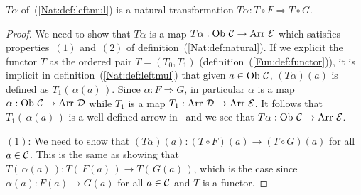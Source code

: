 \begin{prop}\label{Nat:prop:leftmul}
    $T\alpha$ of~(\ref{Nat:def:leftmul}) is a natural transformation 
    $T\alpha:T\circ F\Rightarrow T\circ G$.
\end{prop}
\begin{proof}
    We need to show that $T\alpha$ is a map $T\alpha : \ob\ \Cat\to\arr\ \Eat$
    which satisfies properties~$(1)$ and~$(2)$ of 
    definition~(\ref{Nat:def:natural}). If we explicit the functor $T$ as the 
    ordered pair $T=(T_{0},T_{1})$ (definition~(\ref{Fun:def:functor})), it is
    implicit in definition~(\ref{Nat:def:leftmul}) that given $a\in\mbox{\rm Ob}\ \mbox{$\cal C$}$,
    $(T\alpha)(a)$ is defined as $T_{1}(\,\alpha(a)\,)$. Since 
    $\alpha:F\Rightarrow G$, in particular $\alpha$ is a map $\alpha:\mbox{\rm Ob}\ \mbox{$\cal C$}
    \to\mbox{\rm Arr}\ \mbox{$\cal D$}$ while $T_{1}$ is a map $T_{1}:\arr\ \Dat\to\arr\ \Eat$. It 
    follows that $T_{1}(\,\alpha(a)\,)$ is a well defined arrow in \Eat\ and we
    see that $T\alpha:\ob\ \Cat\to\arr\ \Eat$.

    $(1)$: We need to show that $(T\alpha)(a): (T\circ F)(a) \to (T\circ G)(a)$
    for all $a\in\mbox{$\cal C$}$. This is the same as showing that $T(\,\alpha(a)\,) :
    T(\,F(a)\,)\to T(\,G(a)\,)$, which is the case since $\alpha(a):F(a)\to G(a)$ 
    for all $a\in\mbox{$\cal C$}$ and $T$ is a functor.


\end{proof}
